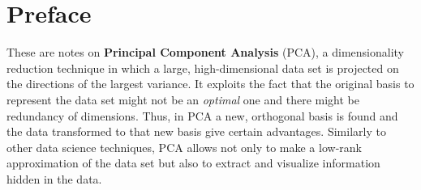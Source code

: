 \documentclass[10pt,twocolumn]{article}
\begin{document}



\vspace{10mm}

\setlength{\parindent}{0cm}

\fontsize{14}{10}\selectfont {Kamila Zdybał}

\vspace{2mm}

\fontsize{8}{10}

\fontsize{8}{10}

\section*{Preface}

These are notes on \textbf{Principal Component Analysis} (PCA), a dimensionality reduction technique in which a large, high-dimensional data set is projected on the directions of the largest variance. It exploits the fact that the original basis to represent the data set might not be an \textit{optimal} one and there might be redundancy of dimensions. Thus, in PCA a new, orthogonal basis is found and the data transformed to that new basis give certain advantages. Similarly to other data science techniques, PCA allows not only to make a low-rank approximation of the data set but also to extract and visualize information hidden in the data.
\end{document}
